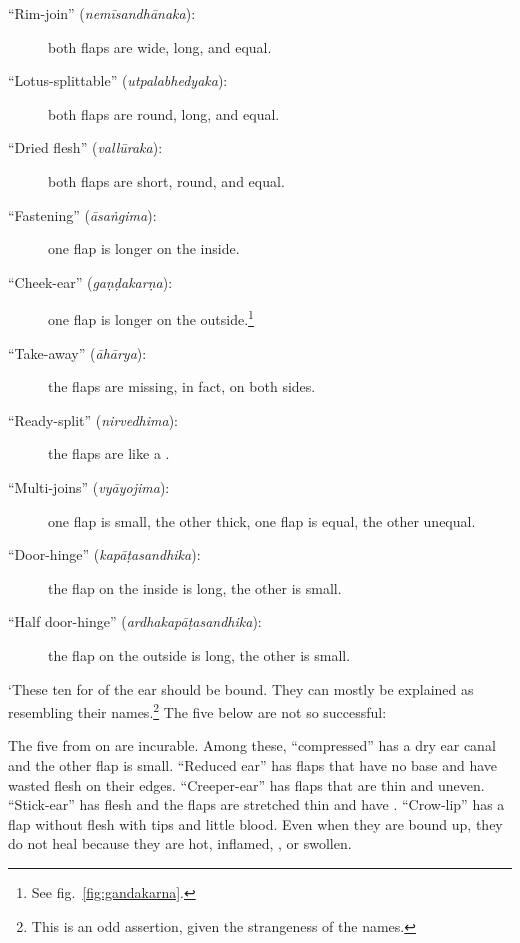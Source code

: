 \begin{translation}
\begin{description}
        \item[\mdseries``Rim-join'' (\emph{nemīsandhānaka}):]
        both flaps are wide, long, and equal.
        
        \item[\mdseries``Lotus-splittable'' (\emph{utpalabhedyaka}):]
        both flaps are round, long, and equal.
        
        \item[\mdseries``Dried flesh'' (\emph{vallūraka}):]
        both flaps are short, round, and equal.
        
        \item[\mdseries``Fastening'' (\emph{āsaṅgima}):]
        one flap is longer on the inside.
        
        \item[\mdseries``Cheek-ear'' (\emph{gaṇḍakarṇa}):]
        one flap is longer on the outside.\footnote{See fig.~\ref{fig:gandakarna}.}
        
        \item[\mdseries``Take-away'' (\emph{āhārya}):]
        the flaps are missing, in fact, on both sides.
        
        \item[\mdseries``Ready-split'' (\emph{nirvedhima}):]
        the flaps are like a .
        
        \item[\mdseries``Multi-joins'' (\emph{vyāyojima}):]
        one flap is small, the other thick, one flap is equal, the other unequal.
        
        \item[\mdseries``Door-hinge'' (\emph{kapāṭasandhika}):]
        the flap on the inside is long, the other is small.
        
        \item[\mdseries``Half door-hinge'' (\emph{ardhakapāṭasandhika}):]
        the flap on the outside is long, the other is small.
    \end{description}
    
    `These ten  for  of the ear should be
    bound.  They can mostly be explained as resembling their names.\footnote{This
    is an odd assertion, given the strangeness of the names.}  The five below are
    not so successful:
    
    
    The five from  on are incurable.  Among these, 
    “compressed” has a dry ear canal and the other flap is small.   “Reduced ear” has 
    flaps that have no base and have wasted flesh on their edges. “Creeper-ear” has 
    flaps that are thin and uneven. “Stick-ear” has  flesh and the 
    flaps are stretched thin and have  .  “Crow-lip” 
    has a flap 
    without flesh with  tips and little blood. Even when 
    they are bound up, they do not heal because they are hot, inflamed, 
    , or swollen.
    

\end{translation}
